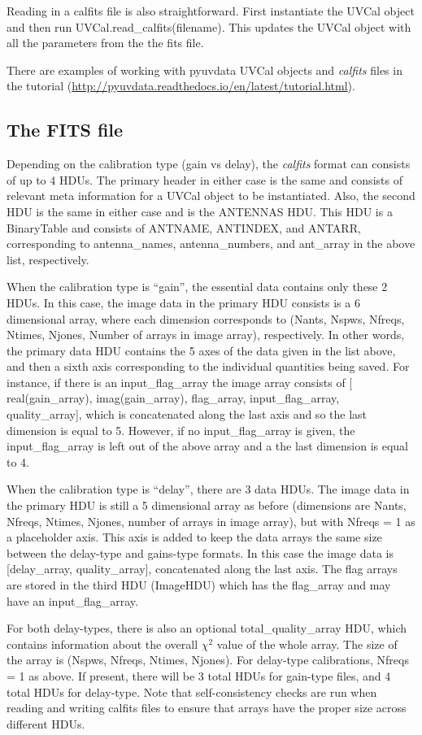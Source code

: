 \documentclass[11pt, oneside]{article}   	%
\begin{document}
Reading in a calfits file is also straightforward. First instantiate the UVCal object and
then run UVCal.read\_calfits(filename). This updates the UVCal object with all
the parameters from the the fits file.

There are examples of working with pyuvdata UVCal objects and \textit{calfits} files in
the tutorial (\url{http://pyuvdata.readthedocs.io/en/latest/tutorial.html}).

\subsection{The FITS file}
Depending on the calibration type (gain vs delay), the \textit{calfits}
format can consists of up to 4 HDUs. The primary header in either case is the
same and consists of relevant meta information for a UVCal object to be
instantiated. Also, the second HDU is the same in either case and is the ANTENNAS
HDU. This HDU is a BinaryTable and consists of ANTNAME, ANTINDEX, and ANTARR,
corresponding to antenna\_names, antenna\_numbers, and ant\_array in the above
list, respectively.

When the calibration type is ``gain'', the essential data contains only these 2
HDUs. In this case, the image data in the primary HDU consists is a 6
dimensional array, where each dimension corresponds to (Nants, Nspws, Nfreqs,
Ntimes, Njones, Number of arrays in image array), respectively. In other words,
the primary data HDU contains the 5 axes of the data given in the list above,
and then a sixth axis corresponding to the individual quantities being
saved. For instance, if there is an input\_flag\_array the image array consists
of [ real(gain\_array), imag(gain\_array), flag\_array, input\_flag\_array,
quality\_array], which is concatenated along the last axis and so the last
dimension is equal to 5. However, if no input\_flag\_array is given, the
input\_flag\_array is left out of the above array and a the last dimension is
equal to 4.

When the calibration type is ``delay'', there are 3 data HDUs. The image data in
the primary HDU is still a 5 dimensional array as before (dimensions are Nants,
Nfreqs, Ntimes, Njones, number of arrays in image array), but with Nfreqs = 1 as
a placeholder axis. This axis is added to keep the data arrays the same size
between the delay-type and gains-type formats. In this case the image data is
[delay\_array, quality\_array], concatenated along the last axis. The flag
arrays are stored in the third HDU (ImageHDU) which has the flag\_array and may
have an input\_flag\_array.

For both delay-types, there is also an optional total\_quality\_array HDU, which
contains information about the overall $\chi^2$ value of the whole array. The
size of the array is (Nspws, Nfreqs, Ntimes, Njones). For delay-type
calibrations, Nfreqs = 1 as above. If present, there will be 3 total HDUs for
gain-type files, and 4 total HDUs for delay-type. Note that self-consistency
checks are run when reading and writing calfits files to ensure that arrays have
the proper size across different HDUs.
\end{document}
